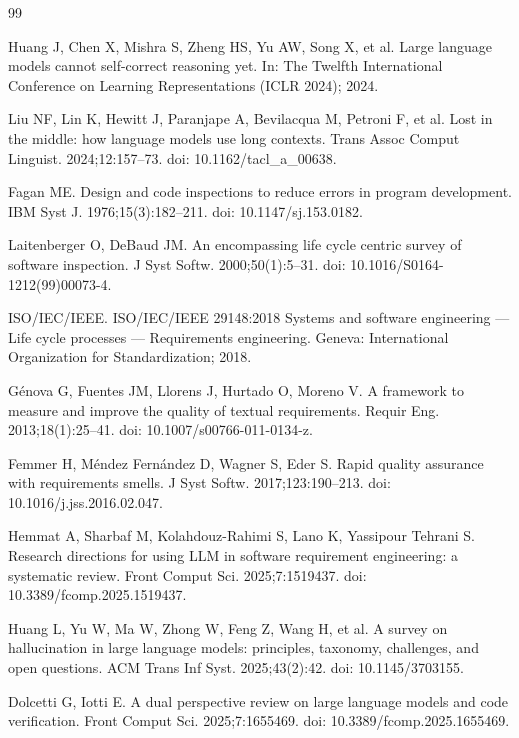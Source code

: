 \documentclass{IOS-Book-Article}
\begin{document}
\begin{thebibliography}{99}

 Huang J, Chen X, Mishra S, Zheng HS, Yu AW, Song X, et al. Large language models cannot self-correct reasoning yet. In: The Twelfth International Conference on Learning Representations (ICLR 2024); 2024.

 Liu NF, Lin K, Hewitt J, Paranjape A, Bevilacqua M, Petroni F, et al. Lost in the middle: how language models use long contexts. Trans Assoc Comput Linguist. 2024;12:157--73. doi: 10.1162/tacl\_a\_00638.

 Fagan ME. Design and code inspections to reduce errors in program development. IBM Syst J. 1976;15(3):182--211. doi: 10.1147/sj.153.0182.

 Laitenberger O, DeBaud JM. An encompassing life cycle centric survey of software inspection. J Syst Softw. 2000;50(1):5--31. doi: 10.1016/S0164-1212(99)00073-4.

 ISO/IEC/IEEE. ISO/IEC/IEEE 29148:2018 Systems and software engineering --- Life cycle processes --- Requirements engineering. Geneva: International Organization for Standardization; 2018.

 G\'enova G, Fuentes JM, Llorens J, Hurtado O, Moreno V. A framework to measure and improve the quality of textual requirements. Requir Eng. 2013;18(1):25--41. doi: 10.1007/s00766-011-0134-z.

 Femmer H, M\'endez Fern\'andez D, Wagner S, Eder S. Rapid quality assurance with requirements smells. J Syst Softw. 2017;123:190--213. doi: 10.1016/j.jss.2016.02.047.

 Hemmat A, Sharbaf M, Kolahdouz-Rahimi S, Lano K, Yassipour Tehrani S. Research directions for using LLM in software requirement engineering: a systematic review. Front Comput Sci. 2025;7:1519437. doi: 10.3389/fcomp.2025.1519437.

 Huang L, Yu W, Ma W, Zhong W, Feng Z, Wang H, et al. A survey on hallucination in large language models: principles, taxonomy, challenges, and open questions. ACM Trans Inf Syst. 2025;43(2):42. doi: 10.1145/3703155.

 Dolcetti G, Iotti E. A dual perspective review on large language models and code verification. Front Comput Sci. 2025;7:1655469. doi: 10.3389/fcomp.2025.1655469.


\end{thebibliography}
\end{document}
